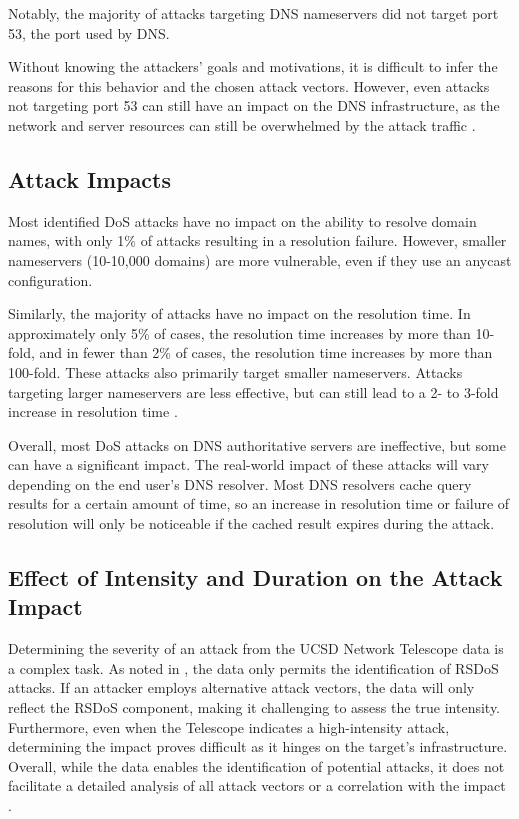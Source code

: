 Notably, the majority of attacks targeting DNS nameservers did not target port 53, the port used by DNS.

Without knowing the attackers' goals and motivations, it is difficult to infer the reasons for this behavior and the chosen attack vectors.
However, even attacks not targeting port 53 can still have an impact on the DNS infrastructure, as the network and server resources can still be overwhelmed by the attack traffic \cite{Sommese2022DDoSDNS}.


\subsection{Attack Impacts}
Most identified \ac{DoS} attacks have no impact on the ability to resolve domain names, with only 1\% of attacks resulting in a resolution failure.
However, smaller nameservers (10-10,000 domains) are more vulnerable, even if they use an anycast configuration.

Similarly, the majority of attacks have no impact on the resolution time.
In approximately only 5\% of cases, the resolution time increases by more than 10-fold, and in fewer than 2\% of cases, the resolution time increases by more than 100-fold.
These attacks also primarily target smaller nameservers.
Attacks targeting larger nameservers are less effective, but can still lead to a 2- to 3-fold increase in resolution time \cite{Sommese2022DDoSDNS}.

Overall, most \ac{DoS} attacks on DNS authoritative servers are ineffective, but some can have a significant impact.
The real-world impact of these attacks will vary depending on the end user's DNS resolver.
Most DNS resolvers cache query results for a certain amount of time, so an increase in resolution time or failure of resolution will only be noticeable if the cached result expires during the attack.


\subsection{Effect of Intensity and Duration on the Attack Impact}
Determining the severity of an attack from the UCSD Network Telescope data is a complex task.
As noted in , the data only permits the identification of \ac{RSDoS} attacks.
If an attacker employs alternative attack vectors, the data will only reflect the \ac{RSDoS} component, making it challenging to assess the true intensity.
Furthermore, even when the Telescope indicates a high-intensity attack, determining the impact proves difficult as it hinges on the target's infrastructure.
Overall, while the data enables the identification of potential attacks, it does not facilitate a detailed analysis of all attack vectors or a correlation with the impact \cite{moore2006}.

